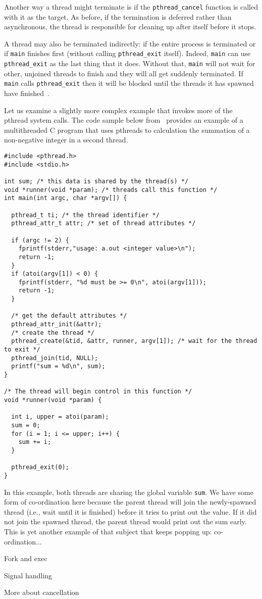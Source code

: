 Another way a thread might terminate is if the \texttt{pthread\_cancel} function is called with it as the target. As before, if the termination is deferred rather than asynchronous, the thread is responsible for cleaning up after itself before it stops.

A thread may also be terminated indirectly: if the entire process is terminated or if \texttt{main} finishes first (without calling \texttt{pthread\_exit} itself). Indeed, \texttt{main} can use \texttt{pthread\_exit} as the last thing that it does. Without that, \texttt{main} will not wait for other, unjoined threads to finish and they will all get suddenly terminated. If \texttt{main} calls \texttt{pthread\_exit} then it will be blocked until the threads it has spawned have finished~\cite{pthreads}.



Let us examine a slightly more complex example that invokes more of the pthread system calls. The code sample below from~\cite{osc} provides an example of a multithreaded C program that uses pthreads to calculation the summation of a non-negative integer in a second thread. 

\begin{verbatim}
#include <pthread.h>
#include <stdio.h>

int sum; /* this data is shared by the thread(s) */
void *runner(void *param); /* threads call this function */
int main(int argc, char *argv[]) {

  pthread_t ti; /* the thread identifier */
  pthread_attr_t attr; /* set of thread attributes */

  if (argc != 2) {
    fprintf(stderr,"usage: a.out <integer value>\n"); 
    return -1;
  }
  if (atoi(argv[1]) < 0) {
    fprintf(stderr, "%d must be >= 0\n", atoi(argv[1])); 
    return -1;
  }

  /* get the default attributes */
  pthread_attr_init(&attr);
  /* create the thread */
  pthread_create(&tid, &attr, runner, argv[1]); /* wait for the thread to exit */
  pthread_join(tid, NULL); 
  printf("sum = %d\n", sum);
}

/* The thread will begin control in this function */ 
void *runner(void *param) {

  int i, upper = atoi(param);
  sum = 0;
  for (i = 1; i <= upper; i++) {
    sum += i;
  }
  
  pthread_exit(0);
}
\end{verbatim}

In this example, both threads are sharing the global variable \texttt{sum}. We have some form of co-ordination here because the parent thread will join the newly-spawned thread (i.e., wait until it is finished) before it tries to print out the value. If it did not join the spawned thread, the parent thread would print out the sum early. This is yet another example of that subject that keeps popping up: co-ordination...


Fork and exec


Signal handling

More about cancellation




